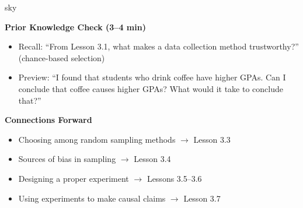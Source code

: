 \documentclass[10pt]{article}
\begin{document}
\begin{skillbox}{sky}
\begin{minipage}[t]{0.48\linewidth}
    \textbf{Prior Knowledge Check (3--4 min)}
    \begin{itemize}
        \item Recall: ``From Lesson 3.1, what makes a data collection method
              trustworthy?'' (chance-based selection)
        \item Preview: ``I found that students who drink coffee have higher GPAs. Can I
              conclude that coffee causes higher GPAs? What would it take to conclude
              that?''
    \end{itemize}
\end{minipage}
\hfill
\begin{minipage}[t]{0.48\linewidth}
    \textbf{Connections Forward}
    \begin{itemize}
        \item Choosing among random sampling methods $\to$ Lesson 3.3
        \item Sources of bias in sampling $\to$ Lesson 3.4
        \item Designing a proper experiment $\to$ Lessons 3.5--3.6
        \item Using experiments to make causal claims $\to$ Lesson 3.7
    \end{itemize}
\end{minipage}
\end{skillbox}
\end{document}
